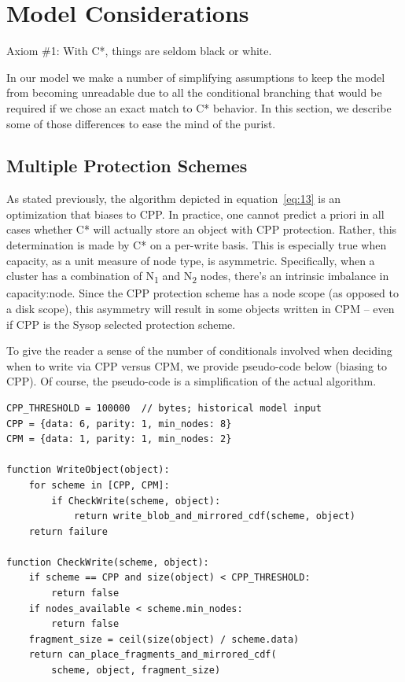 \section{Model Considerations}\label{model-considerations-1}

Axiom \#1: With C*, things are seldom black or white.

In our model we make a number of simplifying assumptions to keep the model from becoming unreadable due to all the conditional branching that would be required if we chose an exact match to C* behavior. In this section, we describe some of those differences to ease the mind of the purist.

\subsection{Multiple Protection Schemes}\label{multiple-protection-schemes-3}

As stated previously, the algorithm depicted in equation~\eqref{eq:13} is an optimization that biases to CPP. In practice, one cannot predict a priori in all cases whether C* will actually store an object with CPP protection. Rather, this determination is made by C* on a per-write basis. This is especially true when capacity, as a unit measure of node type, is asymmetric. Specifically, when a cluster has a combination of N\textsubscript{1} and N\textsubscript{2} nodes, there's an intrinsic imbalance in capacity:node. Since the CPP protection scheme has a node scope (as opposed to a disk scope), this asymmetry will result in some objects written in CPM -- even if CPP is the Sysop selected protection scheme.

To give the reader a sense of the number of conditionals involved when deciding when to write via CPP versus CPM, we provide pseudo-code below (biasing to CPP). Of course, the pseudo-code is a simplification of the actual algorithm.

\begin{lstlisting}
CPP_THRESHOLD = 100000  // bytes; historical model input
CPP = {data: 6, parity: 1, min_nodes: 8}
CPM = {data: 1, parity: 1, min_nodes: 2}

function WriteObject(object):
    for scheme in [CPP, CPM]:
        if CheckWrite(scheme, object):
            return write_blob_and_mirrored_cdf(scheme, object)
    return failure

function CheckWrite(scheme, object):
    if scheme == CPP and size(object) < CPP_THRESHOLD:
        return false
    if nodes_available < scheme.min_nodes:
        return false
    fragment_size = ceil(size(object) / scheme.data)
    return can_place_fragments_and_mirrored_cdf(
        scheme, object, fragment_size)
\end{lstlisting}


